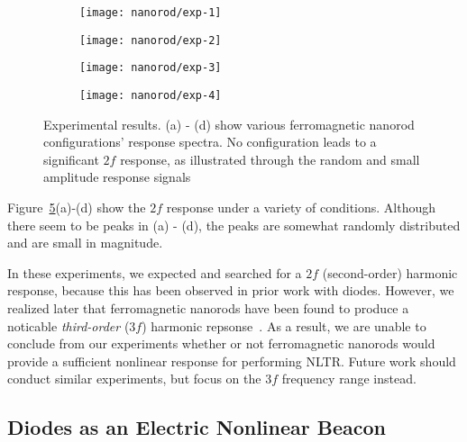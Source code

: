  \begin{figure}
     \centering
     \begin{subfigure}{0.45\textwidth}
         \centering
         \texttt{[image: nanorod/exp-1]}
         \caption[]{}
         \label{fig:nanorod-exp-1}
     \end{subfigure}
         \begin{subfigure}{0.45\textwidth}
         \centering
         \texttt{[image: nanorod/exp-2]}
         \caption[]{}
         \label{fig:nanorod-exp-2}
     \end{subfigure}
         \begin{subfigure}{0.45\textwidth}
         \centering
         \texttt{[image: nanorod/exp-3]}
         \caption[]{}
         \label{fig:nanorod-exp-3}
     \end{subfigure}
         \begin{subfigure}{0.45\textwidth}
         \centering
         \texttt{[image: nanorod/exp-4]}
         \caption[]{}
         \label{fig:nanorod-exp-4}
     \end{subfigure}
     \caption[Ferromagnetic nanorod experimental results]{Experimental results. (a) - (d) show various ferromagnetic nanorod configurations' response spectra. No configuration leads to a significant $2f$ response, as illustrated through the random and small amplitude response signals}
     \label{fig:nanorod-results}
 \end{figure}

Figure~\ref{fig:nanorod-results}(a)-(d) show the $2f$ response under a variety of conditions. Although there seem to be peaks in (a) - (d), the peaks are somewhat randomly distributed and are small in magnitude.

In these experiments, we expected and searched for a $2f$ (second-order) harmonic response, because this has been observed in prior work with diodes. However, we realized later that ferromagnetic nanorods have been found to produce a noticable \textit{third-order} ($3f$) harmonic repsonse~\cite{nanorod-third-order}. As a result, we are unable to conclude from our experiments whether or not ferromagnetic nanorods would provide a sufficient nonlinear response for performing NLTR. Future work should conduct similar experiments, but focus on the $3f$ frequency range instead.

\subsection{Diodes as an Electric Nonlinear Beacon}


